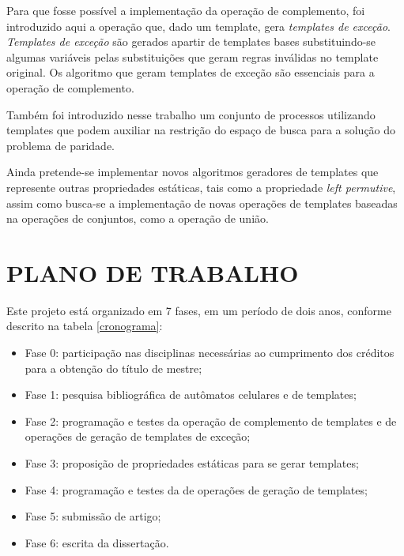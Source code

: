 Para que fosse possível a implementação da operação de complemento, foi introduzido aqui a operação que, dado um template, gera \textit{templates de exceção}. \textit{Templates de exceção} são gerados apartir de templates bases substituindo-se algumas variáveis pelas substituições que geram regras inválidas no template original. Os algoritmo que geram templates de exceção são essenciais para a operação de complemento.

Também foi introduzido nesse trabalho um conjunto de processos utilizando templates que podem auxiliar na restrição do espaço de busca para a solução do problema de paridade.

Ainda pretende-se implementar novos algoritmos geradores de templates que represente outras propriedades estáticas, tais como a propriedade \textit{left permutive}, assim como busca-se a implementação de novas operações de templates baseadas na operações de conjuntos, como a operação de união.

\section{PLANO DE TRABALHO}

Este projeto está organizado em 7 fases, em um período de dois anos, conforme descrito na tabela \ref{cronograma}:

  \begin{itemize}
      \item Fase 0: participação nas disciplinas necessárias ao cumprimento dos créditos para a obtenção do título de mestre;
      \item Fase 1: pesquisa bibliográfica de autômatos celulares e de templates;
      \item Fase 2: programação e testes da operação de complemento de templates e de operações de geração de templates de exceção;
      \item Fase 3: proposição de propriedades estáticas para se gerar templates;
      \item Fase 4: programação e testes da de operações de geração de templates;
      \item Fase 5: submissão de artigo;
      \item Fase 6: escrita da dissertação.
  \end{itemize}

